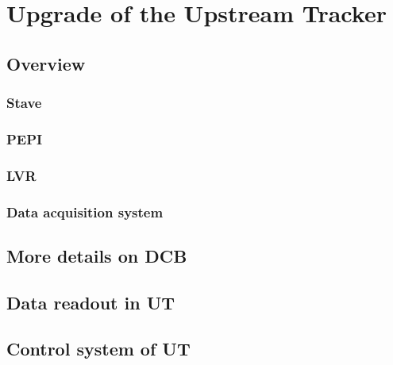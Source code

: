 \chapter{Upgrade of the Upstream Tracker}
\label{ref:ut}


\section{Overview}
\label{ref:ut:overview}

\subsection{Stave}

\subsection{PEPI}

\subsection{LVR}

\subsection{Data acquisition system}


\section{More details on DCB}


\section{Data readout in UT}


\section{Control system of UT}
